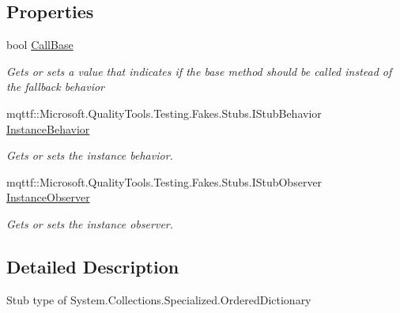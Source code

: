 \subsection*{Properties}
\begin{DoxyCompactItemize}
\item 
bool \hyperlink{class_system_1_1_collections_1_1_specialized_1_1_fakes_1_1_stub_ordered_dictionary_a1e603aa35de4e408005fdf0d408920c9}{Call\-Base}
\begin{DoxyCompactList}\small\item\em Gets or sets a value that indicates if the base method should be called instead of the fallback behavior\end{DoxyCompactList}\item 
mqttf\-::\-Microsoft.\-Quality\-Tools.\-Testing.\-Fakes.\-Stubs.\-I\-Stub\-Behavior \hyperlink{class_system_1_1_collections_1_1_specialized_1_1_fakes_1_1_stub_ordered_dictionary_ab141c26ae2aa170136866ce1698c419e}{Instance\-Behavior}
\begin{DoxyCompactList}\small\item\em Gets or sets the instance behavior.\end{DoxyCompactList}\item 
mqttf\-::\-Microsoft.\-Quality\-Tools.\-Testing.\-Fakes.\-Stubs.\-I\-Stub\-Observer \hyperlink{class_system_1_1_collections_1_1_specialized_1_1_fakes_1_1_stub_ordered_dictionary_abc41206655285be6df1c80f9c648d188}{Instance\-Observer}
\begin{DoxyCompactList}\small\item\em Gets or sets the instance observer.\end{DoxyCompactList}\end{DoxyCompactItemize}


\subsection{Detailed Description}
Stub type of System.\-Collections.\-Specialized.\-Ordered\-Dictionary



